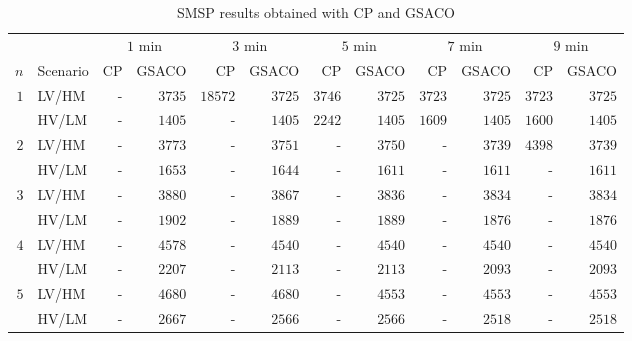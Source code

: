 \begin{table}[t]
	\caption{SMSP results obtained with CP and GSACO}\label{tab:results} \centering
	\begin{tabular}{|r|l|r|r|r|r|r|r|r|r|r|r|}
		\hline
		&
		&
		\multicolumn{2}{c}{$1$ min} &
		\multicolumn{2}{c}{$3$ min} &
		\multicolumn{2}{c}{$5$ min} &
		\multicolumn{2}{c}{$7$ min} &
		\multicolumn{2}{c}{$9$ min} \\ \cline{3-12} 
		$n$ & Scenario & CP & GSACO & CP & GSACO & CP & GSACO & CP & GSACO & CP & GSACO \\ \hline
		\multirow{2}{*}{$1$} & LV/HM & - & $3735$ & $18572$ & $3725$ & $3746$ & $3725$ & $3723$ & $3725$ & $3723$ & $3725$  \\
		& HV/LM & - & $1405$ & - & $1405$ & $2242$ & $1405$ & $1609$ & $1405$ & $1600$ & $1405$ \\
		\multirow{2}{*}{$2$} & LV/HM & - & $3773$ & - & $3751$ & - & $3750$ & - & $3739$ & $4398$ & $3739$ \\
		& HV/LM & - & $1653$ & - & $1644$ & - & $1611$ & - & $1611$ & - & $1611$   \\
		\multirow{2}{*}{$3$} & LV/HM & - & $3880$ & - & $3867$ & - & $3836$ & - & $3834$ & - & $3834$   \\
		& HV/LM & - & $1902$ & - & $1889$ & - & $1889$ & - & $1876$ & - & $1876$     \\
		\multirow{2}{*}{$4$} & LV/HM & - & $4578$ & - & $4540$ & - & $4540$ & - & $4540$ & - & $4540$     \\
		& HV/LM & - & $2207$ & - & $2113$ & - & $2113$ & - & $2093$ & - & $2093$  \\
		\multirow{2}{*}{$5$} & LV/HM & - & $4680$ & - & $4680$ & - & $4553$ & - & $4553$ & - & $4553$   \\	
		& HV/LM & - & $2667$ & - & $2566$ & - & $2566$ & - & $2518$ & - & $2518$ \\
		\hline  
	\end{tabular}
\end{table}



